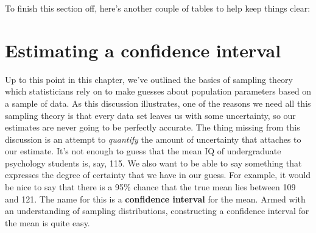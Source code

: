 \documentclass[
  11pt,
  a4paper,
  twoside,symmetric,openright]{book}
\theoremstyle{break}
\theoremstyle{break}
\begin{document}
To finish this section off, here's another couple of tables to help keep things clear:

\begin{table}
\centering
{}
\end{table}

\section{Estimating a confidence interval}\label{ci}

Up to this point in this chapter, we've outlined the basics of sampling theory which statisticians rely on to make guesses about population parameters based on a sample of data. As this discussion illustrates, one of the reasons we need all this sampling theory is that every data set leaves us with some uncertainty, so our estimates are never going to be perfectly accurate. The thing missing from this discussion is an attempt to \emph{quantify} the amount of uncertainty that attaches to our estimate. It's not enough to guess that the mean IQ of undergraduate psychology students is, say, 115. We also want to be able to say something that expresses the degree of certainty that we have in our guess. For example, it would be nice to say that there is a 95\% chance that the true mean lies between 109 and 121. The name for this is a \textbf{confidence interval} for the mean. Armed with an understanding of sampling distributions, constructing a confidence interval for the mean is quite easy.
\end{document}
